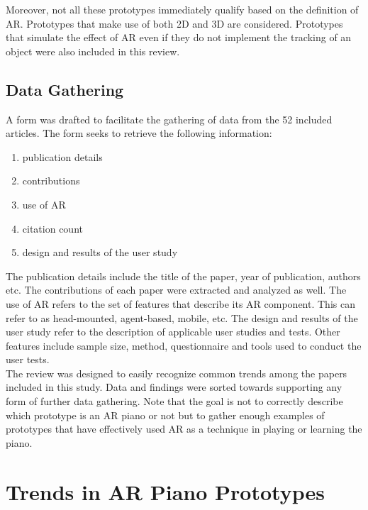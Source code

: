 \documentclass[manuscript,screen]{acmart}
\begin{document}
Moreover, not all these prototypes immediately qualify based on the definition of AR. Prototypes that make use of both 2D and 3D are considered. Prototypes that simulate the effect of AR even if they do not implement the tracking of an object were also included in this review. 

\subsection{Data Gathering}
A form was drafted to facilitate the gathering of data from the 52 included articles. The form seeks to retrieve the following information: 
\begin{enumerate}
    \item publication details
    \item contributions
    \item use of AR
    \item citation count
    \item design and results of the user study
\end{enumerate}
The publication details include the title of the paper, year of publication, authors etc. The contributions of each paper were extracted and analyzed as well. The use of AR refers to the set of features that describe its AR component. This can refer to as head-mounted, agent-based, mobile, etc. The design and results of the user study refer to the description of applicable user studies and tests. Other features include sample size, method, questionnaire and tools used to conduct the user tests. \\

The review was designed to easily recognize common trends among the papers included in this study. Data and findings were sorted towards supporting any form of further data gathering. Note that the goal is not to correctly describe which prototype is an AR piano or not but to gather enough examples of prototypes that have effectively used AR as a technique in playing or learning the piano.  
\section{Trends in AR Piano Prototypes}
\end{document}
